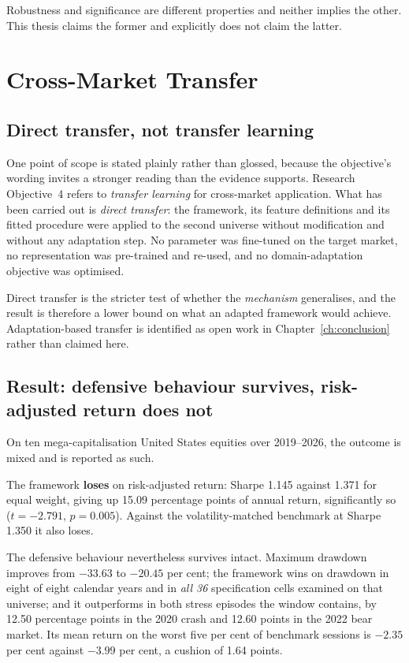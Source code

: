 Robustness and significance are different properties and neither implies the other. This thesis
claims the former and explicitly does not claim the latter.

\section{Cross-Market Transfer}
\label{sec:alloc-transfer}

\subsection{Direct transfer, not transfer learning}

One point of scope is stated plainly rather than glossed, because the objective's wording invites
a stronger reading than the evidence supports. Research Objective~4 refers to \emph{transfer
learning} for cross-market application. What has been carried out is \emph{direct transfer}: the
framework, its feature definitions and its fitted procedure were applied to the second universe
without modification and without any adaptation step. No parameter was fine-tuned on the target
market, no representation was pre-trained and re-used, and no domain-adaptation objective was
optimised.

Direct transfer is the stricter test of whether the \emph{mechanism} generalises, and the result is
therefore a lower bound on what an adapted framework would achieve. Adaptation-based transfer is
identified as open work in Chapter~\ref{ch:conclusion} rather than claimed here.

\subsection{Result: defensive behaviour survives, risk-adjusted return does not}

On ten mega-capitalisation United States equities over 2019--2026, the outcome is mixed and is
reported as such.

The framework \textbf{loses} on risk-adjusted return: Sharpe 1.145 against 1.371 for equal weight,
giving up 15.09 percentage points of annual return, significantly so ($t = -2.791$, $p = 0.005$).
Against the volatility-matched benchmark at Sharpe 1.350 it also loses.

The defensive behaviour nevertheless survives intact. Maximum drawdown improves from $-33.63$ to
$-20.45$ per cent; the framework wins on drawdown in eight of eight calendar years and in
\emph{all 36} specification cells examined on that universe; and it outperforms in both stress
episodes the window contains, by 12.50 percentage points in the 2020 crash and 12.60 points in the
2022 bear market. Its mean return on the worst five per cent of benchmark sessions is $-2.35$ per
cent against $-3.99$ per cent, a cushion of 1.64 points.


